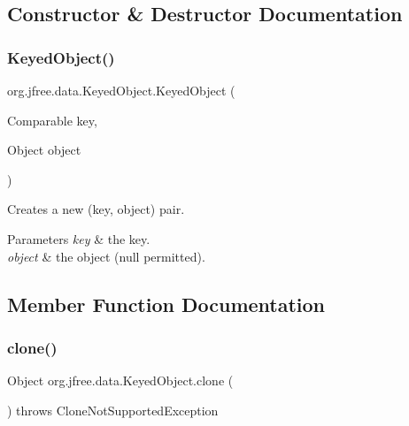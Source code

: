 \subsection{Constructor \& Destructor Documentation}
\mbox{\label{classorg_1_1jfree_1_1data_1_1_keyed_object_a40c182c70a4b378797174c268b841df6}} 
\subsubsection{\texorpdfstring{Keyed\+Object()}{KeyedObject()}}
{\footnotesize\ttfamily org.\+jfree.\+data.\+Keyed\+Object.\+Keyed\+Object (\begin{DoxyParamCaption}\item[{Comparable}]{key,  }\item[{Object}]{object }\end{DoxyParamCaption})}

Creates a new (key, object) pair.


\begin{DoxyParams}{Parameters}
{\em key} & the key. \\
\hline
{\em object} & the object ({\ttfamily null} permitted). \\
\hline
\end{DoxyParams}


\subsection{Member Function Documentation}
\mbox{\label{classorg_1_1jfree_1_1data_1_1_keyed_object_a8e65b6440ec9f72f892239008eed3bab}} 
\subsubsection{\texorpdfstring{clone()}{clone()}}
{\footnotesize\ttfamily Object org.\+jfree.\+data.\+Keyed\+Object.\+clone (\begin{DoxyParamCaption}{ }\end{DoxyParamCaption}) throws Clone\+Not\+Supported\+Exception}

